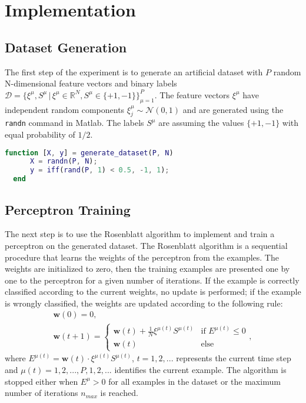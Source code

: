 \section{Implementation}

\subsection{Dataset Generation}
The first step of the experiment is to generate an artificial dataset with $P$ random N-dimensional feature vectors and binary labels $\mathcal{D} = \{ \xi^\mu, S^\mu \,|\, \xi^\mu \in \mathds{R}^N, S^\mu \in \{+1, -1\} \}_{\mu=1}^P$.
The feature vectors $\xi^\mu$ have independent random components $\xi_j^\mu \sim \mathcal{N}(0, 1)$ and are generated using the \texttt{randn} command in Matlab.
The labels $S^\mu$ are assuming the values $\{+1, -1\}$ with equal probability of $1/2$.

\begin{lstlisting}[language=Matlab]
  function [X, y] = generate_dataset(P, N)
      X = randn(P, N);
      y = iff(rand(P, 1) < 0.5, -1, 1);
  end
\end{lstlisting}

\subsection{Perceptron Training}
The next step is to use the Rosenblatt algorithm to implement and train a perceptron on the generated dataset.
The Rosenblatt algorithm is a sequential procedure that learns the weights of the perceptron from the examples.
The weights are initialized to zero, then the training examples are presented one by one to the perceptron for a given number of iterations.
If the example is correctly classified according to the current weights, no update is performed;
if the example is wrongly classified, the weights are updated according to the following rule:
\begin{gather} 
    \mathsf{\bm{w}}(0) = 0, \\
    \mathsf{\bm{w}}(t + 1) =
        \begin{cases}
            \mathsf{\bm{w}}(t) + \frac{1}{N} \xi^{\mu(t)} S^{\mu(t)} &\text{if $E^{\mu(t)} \leq 0$}\\
            \mathsf{\bm{w}}(t) &\text{else}
        \end{cases},
    \label{eq:update-rule}
\end{gather}
where $E^{\mu(t)} = \mathsf{\bm{w}}(t) \cdot \xi^{\mu(t)} S^{\mu(t)}$, $t = 1, 2, ...$ represents the current time step and $\mu(t) = 1, 2, ..., P, 1, 2, ...$ identifies the current example.
The algorithm is stopped either when $E^\mu > 0$ for all examples in the dataset or the maximum number of iterations $n_{max}$ is reached.

